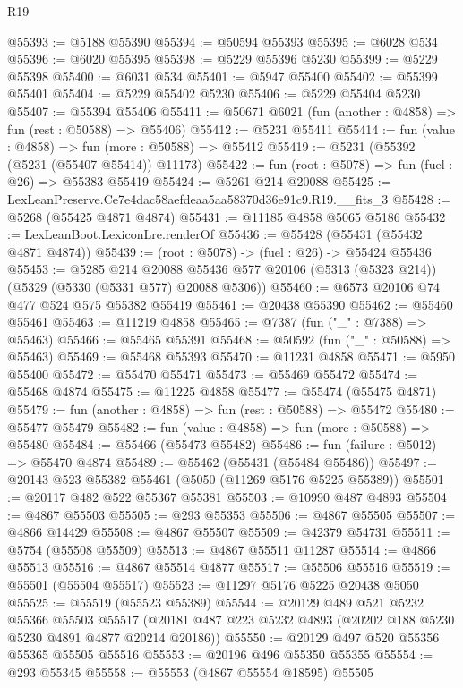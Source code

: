 \begin{lexlean}{R19}
\begin{coremodule}
@55393 := @5188 @55390
@55394 := @50594 @55393
@55395 := @6028 @534
@55396 := @6020 @55395
@55398 := @5229 @55396 @5230
@55399 := @5229 @55398
@55400 := @6031 @534
@55401 := @5947 @55400
@55402 := @55399 @55401
@55404 := @5229 @55402 @5230
@55406 := @5229 @55404 @5230
@55407 := @55394 @55406
@55411 := @50671 @6021 (fun (another : @4858) => fun (rest : @50588) => @55406)
@55412 := @5231 @55411
@55414 := fun (value : @4858) => fun (more : @50588) => @55412
@55419 := @5231 (@55392 (@5231 (@55407 @55414)) @11173)
@55422 := fun (root : @5078) => fun (fuel : @26) => @55383 @55419
@55424 := @5261 @214 @20088
@55425 := LexLeanPreserve.Ce7e4dac58aefdeaa5aa58370d36e91c9.R19.__fits_3
@55428 := @5268 (@55425 @4871 @4874)
@55431 := @11185 @4858 @5065 @5186
@55432 := LexLeanBoot.LexiconLre.renderOf
@55436 := @55428 (@55431 (@55432 @4871 @4874))
@55439 := (root : @5078) -> (fuel : @26) -> @55424 @55436
@55453 := @5285
    @214
    @20088
    @55436
    @577
    @20106
    (@5313 (@5323 @214))
    (@5329 (@5330 (@5331 @577) @20088 @5306))
@55460 := @6573 @20106 @74 @477 @524 @575 @55382 @55419
@55461 := @20438 @55390
@55462 := @55460 @55461
@55463 := @11219 @4858
@55465 := @7387 (fun ("_" : @7388) => @55463)
@55466 := @55465 @55391
@55468 := @50592 (fun ("_" : @50588) => @55463)
@55469 := @55468 @55393
@55470 := @11231 @4858
@55471 := @5950 @55400
@55472 := @55470 @55471
@55473 := @55469 @55472
@55474 := @55468 @4874
@55475 := @11225 @4858
@55477 := @55474 (@55475 @4871)
@55479 := fun (another : @4858) => fun (rest : @50588) => @55472
@55480 := @55477 @55479
@55482 := fun (value : @4858) => fun (more : @50588) => @55480
@55484 := @55466 (@55473 @55482)
@55486 := fun (failure : @5012) => @55470 @4874
@55489 := @55462 (@55431 (@55484 @55486))
@55497 := @20143 @523 @55382 @55461 (@5050 (@11269 @5176 @5225 @55389))
@55501 := @20117 @482 @522 @55367 @55381
@55503 := @10990 @487 @4893
@55504 := @4867 @55503
@55505 := @293 @55353
@55506 := @4867 @55505
@55507 := @4866 @14429
@55508 := @4867 @55507
@55509 := @42379 @54731
@55511 := @5754 (@55508 @55509)
@55513 := @4867 @55511 @11287
@55514 := @4866 @55513
@55516 := @4867 @55514 @4877
@55517 := @55506 @55516
@55519 := @55501 (@55504 @55517)
@55523 := @11297 @5176 @5225 @20438 @5050
@55525 := @55519 (@55523 @55389)
@55544 := @20129
    @489
    @521
    @5232
    @55366
    @55503
    @55517
    (@20181 @487 @223 @5232 @4893 (@20202 @188 @5230 @5230 @4891 @4877 @20214 @20186))
@55550 := @20129 @497 @520 @55356 @55365 @55505 @55516
@55553 := @20196 @496 @55350 @55355
@55554 := @293 @55345
@55558 := @55553 (@4867 @55554 @18595) @55505

\end{coremodule}
\end{lexlean}
